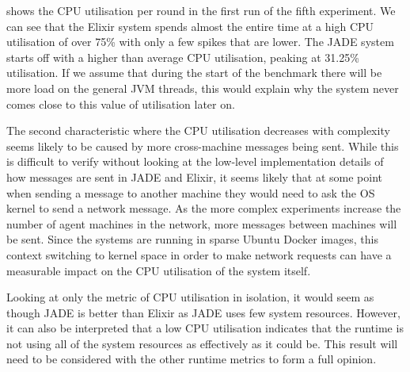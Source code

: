  shows the CPU utilisation per round in the first run of the fifth experiment.
We can see that the Elixir system spends almost the entire time at a high CPU utilisation of over 75\% with only a few spikes that are lower.
The JADE system starts off with a higher than average CPU utilisation, peaking at 31.25\% utilisation.
If we assume that during the start of the benchmark there will be more load on the general JVM threads, this would explain why the system never comes close to this value of utilisation later on.

The second characteristic where the CPU utilisation decreases with complexity seems likely to be caused by more cross-machine messages being sent.
While this is difficult to verify without looking at the low-level implementation details of how messages are sent in JADE and Elixir, it seems likely that at some point when sending a message to another machine they would need to ask the OS kernel to send a network message.
As the more complex experiments increase the number of agent machines in the network, more messages between machines will be sent.
Since the systems are running in sparse Ubuntu Docker images, this context switching to kernel space in order to make network requests can have a measurable impact on the CPU utilisation of the system itself.

Looking at only the metric of CPU utilisation in isolation, it would seem as though JADE is better than Elixir as JADE uses few system resources.
However, it can also be interpreted that a low CPU utilisation indicates that the runtime is not using all of the system resources as effectively as it could be.
This result will need to be considered with the other runtime metrics to form a full opinion.
